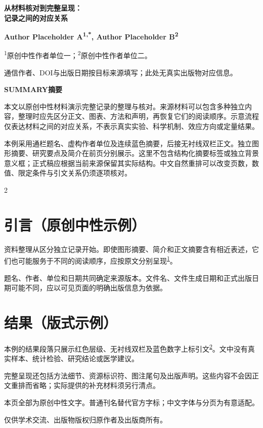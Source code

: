 \documentclass[UTF8,fontset=none,twoside,scheme=plain]{ctexart}
\newcommand{\DevCellTitle}{从材料核对到完整呈现：\\记录之间的对应关系}
\newcommand{\DevCellCite}[1]{\textsuperscript{\hyperlink{devcell-ref:#1}{#1}}}
\begin{document}
{\noindent\bfseries\fontsize{22bp}{27bp}\selectfont\DevCellTitle\par}\vspace{10bp}
{\noindent\bfseries\fontsize{9bp}{12bp}\selectfont Author Placeholder A\textsuperscript{1,*}, Author Placeholder B\textsuperscript{2}\par}\vspace{4bp}
{\noindent\fontsize{7.5bp}{10.4bp}\selectfont\textsuperscript{1}原创中性作者单位一；\textsuperscript{2}原创中性作者单位二。\par *通信作者、DOI与出版日期按目标来源填写；此处无真实出版物对应信息。\par}\vspace{17bp}
{\noindent\color{DevCellRed}\bfseries SUMMARY\quad 摘要\par}\vspace{9bp}
{\fontsize{10bp}{14bp}\selectfont\color{DevCellBlue}
本文以原创中性材料演示完整记录的整理与核对。来源材料可以包含多种独立内容，整理时应先区分正文、图表、方法和声明，再恢复它们的阅读顺序。示意流程仅表达材料之间的对应关系，不表示真实实验、科学机制、效应方向或定量结果。\par
本例采用通栏题名、虚构作者单位及连续蓝色摘要，后接无衬线双栏正文。独立图形摘要、研究要点及简介在前页分别展示。这里不包含结构化摘要标签或独立背景意义框；正式稿应根据当前来源保留其实际结构。中文自然重排可以改变页数，数值、限定条件与引文关系仍须逐项核对。\par}
\vspace{15bp}
\begin{multicols}{2}
\section*{引言（原创中性示例）}
资料整理从区分独立记录开始。即使图形摘要、简介和正文摘要含有相近表述，它们也可能服务于不同的阅读顺序，应按原文分别呈现\DevCellCite{1}。

题名、作者、单位和日期共同确定来源版本。文件名、文件生成日期和正式出版日期可能不同，应以可见页面的明确出版信息为依据。
\section*{结果（版式示例）}
本例的结果段落只展示红色层级、无衬线双栏及蓝色数字上标引文\DevCellCite{2}。文中没有真实样本、统计检验、研究结论或医学建议。

完整呈现还包括方法细节、资源标识符、图注尾句及出版声明。这些内容不会因正文重排而省略；实际提供的补充材料须另行清点。
\end{multicols}
\vfill
{\fontsize{7.6bp}{10bp}\selectfont 本页全部为原创中性文字。普通刊名替代官方字标；中文字体与分页为有意适配。\par
仅供学术交流、出版物版权归原作者及出版商所有。}
\clearpage
\end{document}
